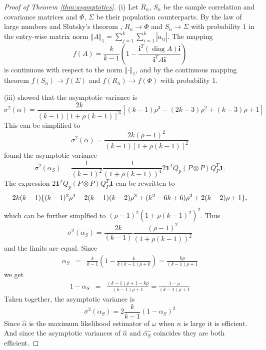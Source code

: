 \documentclass[twoside]{article}
\DeclareMathOperator{\diag}{diag}
\DeclareMathOperator{\tsum}{\textstyle \sum}
\begin{document}
\begin{proof}[Proof of Theorem \ref{thm:asymptotics}]\label{proof:asymptotics}
(i) Let $R_{n}$, $S_{n}$ be the sample correlation and covariance matrices
and $\Phi$, $\Sigma$ be their population counterparts. By the law
of large numbers and Slutsky's theorom \citep[][Lemma 2.8, p. 11]{Van_der_Vaart2000-qc}, $R_{n}\to\Phi$ and $S_{n}\to\Sigma$
with probability $1$ in the entry-wise matrix norm $\left\Vert A\right\Vert _{1}=\tsum_{j=1}^{k}\tsum_{i=1}^{k}\left|a_{ij}\right|$.
The mapping
\[
f(A)=\frac{k}{k-1}\left(1-\frac{\mathbf{i}^{T}(\diag A)\mathbf{i}}{\mathbf{i}^{T}A\mathbf{i}}\right)
\]
is continuous with respect to the norm $\left\Vert \cdot\right\Vert _{1}$,
and by the continuous mapping theorem \citep[][Theorem 2.3, p. 7]{Van_der_Vaart2000-qc}
$f(S_{n})\to f(\Sigma)$ and $f(R_{n})\to f(\Phi)$
with probability 1.

(iii) \citet[eq. 22]{Van_Zyl2000-si} showed that the asymptotic variance
is
\[
\sigma^{2}(\alpha)=\frac{2k}{(k-1)[1+\rho(k-1)]^{3}}[(k-1)\rho^{3}-(2k-3)\rho^{2}+(k-3)\rho+1]
\]
This can be simplified to
\[
\sigma^{2}(\alpha)=\frac{2k(\rho-1)^{2}}{(k-1)[1+\rho(k-1)]^{2}}
\]
\citet[equation 10]{hayashi2005note} found the asymptotic variance
\[
\sigma^{2}(\alpha_S)=\frac{1}{(k-1)^{2}}\frac{1}{(1+\rho(k-1))^{4}}2\mathbf{1}^{T}Q_{p}(P\otimes P)Q_{P}^{T}\mathbf{1}.
\]
The expression $2\mathbf{1}^{T}Q_{p}(P\otimes P)Q_{P}^{T}\mathbf{1}$
can be rewritten to \citep[appendix 3]{hayashi2005note}
\[
2k(k-1)\{ (k-1)^{2}\rho^{4}-2(k-1)(k-2)\rho^{3}+(k^{2}-6k+6)\text{\ensuremath{\rho^{2}+2(k-2)\rho+1}}\} ,
\]
which can be further simplfied to $(\rho-1)^{2}(1+\rho(k-1)^{2})^{2}$.
Thus
\[
\sigma^{2}(\alpha_S)=\frac{2k}{(k-1)}\frac{(\rho-1)^{2}}{(1+\rho(k-1))^{2}}
\]
and the limits are equal.
Since
\begin{eqnarray*}
\alpha_S & = & \frac{k}{k-1}(1-\frac{k}{k(k-1)\rho+k}) = \frac{k\rho}{(k-1)\rho+1}
\end{eqnarray*}
we get
\begin{eqnarray*}
1-\alpha_S & = & \frac{(k-1)\rho+1-k\rho}{(k-1)\rho+1} = \frac{1-\rho}{(k-1)\rho+1}
\end{eqnarray*}
Taken together, the asymptotic variance is
\[
\sigma^{2}(\alpha_S)=2\frac{k}{k-1}(1-\alpha_S)^{2}
\]
Since $\hat{\alpha}$ is the maximum likelihood estimator of $\omega$
when $n$ is large it is efficient. And since the asymptotic variances
of $\hat{\alpha}$ and $\hat{\alpha_S}$ coincides they
are both efficient.
\end{proof}
\end{document}
